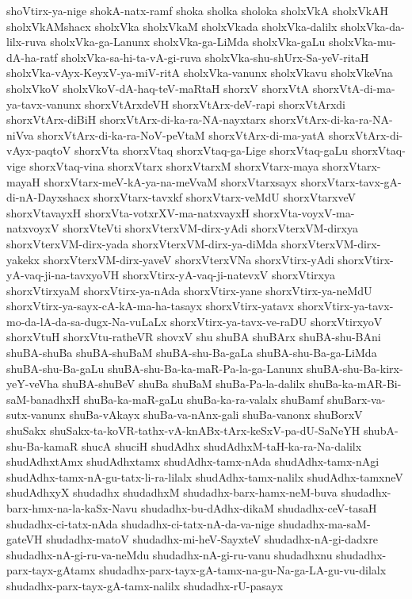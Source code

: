 {shoVtirx-ya-nige
shokA-natx-ramf
shoka
sholka
sholoka
sholxVkA
sholxVkAH
sholxVkAMshacx
sholxVka
sholxVkaM
sholxVkada
sholxVka-dalilx
sholxVka-da-lilx-ruva
sholxVka-ga-Lanunx
sholxVka-ga-LiMda
sholxVka-gaLu
sholxVka-mu-dA-ha-ratf
sholxVka-sa-hi-ta-vA-gi-ruva
sholxVka-shu-shUrx-Sa-yeV-ritaH
sholxVka-vAyx-KeyxV-ya-miV-ritA
sholxVka-vanunx
sholxVkavu
sholxVkeVna
sholxVkoV
sholxVkoV-dA-haq-teV-maRtaH
shorxV
shorxVtA
shorxVtA-di-ma-ya-tavx-vanunx
shorxVtArxdeVH
shorxVtArx-deV-rapi
shorxVtArxdi
shorxVtArx-diBiH
shorxVtArx-di-ka-ra-NA-nayxtarx
shorxVtArx-di-ka-ra-NA-niVva
shorxVtArx-di-ka-ra-NoV-peVtaM
shorxVtArx-di-ma-yatA
shorxVtArx-di-vAyx-paqtoV
shorxVta
shorxVtaq
shorxVtaq-ga-Lige
shorxVtaq-gaLu
shorxVtaq-vige
shorxVtaq-vina
shorxVtarx
shorxVtarxM
shorxVtarx-maya
shorxVtarx-mayaH
shorxVtarx-meV-kA-ya-na-meVvaM
shorxVtarxsayx
shorxVtarx-tavx-gA-di-nA-Dayxshacx
shorxVtarx-tavxkf
shorxVtarx-veMdU
shorxVtarxveV
shorxVtavayxH
shorxVta-votxrXV-ma-natxvayxH
shorxVta-voyxV-ma-natxvoyxV
shorxVteVti
shorxVterxVM-dirx-yAdi
shorxVterxVM-dirxya
shorxVterxVM-dirx-yada
shorxVterxVM-dirx-ya-diMda
shorxVterxVM-dirx-yakekx
shorxVterxVM-dirx-yaveV
shorxVterxVNa
shorxVtirx-yAdi
shorxVtirx-yA-vaq-ji-na-tavxyoVH
shorxVtirx-yA-vaq-ji-natevxV
shorxVtirxya
shorxVtirxyaM
shorxVtirx-ya-nAda
shorxVtirx-yane
shorxVtirx-ya-neMdU
shorxVtirx-ya-sayx-cA-kA-ma-ha-tasayx
shorxVtirx-yatavx
shorxVtirx-ya-tavx-mo-da-lA-da-sa-dugx-Na-vuLaLx
shorxVtirx-ya-tavx-ve-raDU
shorxVtirxyoV
shorxVtuH
shorxVtu-ratheVR
shovxV
shu
shuBA
shuBArx
shuBA-shu-BAni
shuBA-shuBa
shuBA-shuBaM
shuBA-shu-Ba-gaLa
shuBA-shu-Ba-ga-LiMda
shuBA-shu-Ba-gaLu
shuBA-shu-Ba-ka-maR-Pa-la-ga-Lanunx
shuBA-shu-Ba-kirx-yeY-veVha
shuBA-shuBeV
shuBa
shuBaM
shuBa-Pa-la-dalilx
shuBa-ka-mAR-Bi-saM-banadhxH
shuBa-ka-maR-gaLu
shuBa-ka-ra-valalx
shuBamf
shuBarx-va-sutx-vanunx
shuBa-vAkayx
shuBa-va-nAnx-gali
shuBa-vanonx
shuBorxV
shuSakx
shuSakx-ta-koVR-tathx-vA-knABx-tArx-keSxV-pa-dU-SaNeYH
shubA-shu-Ba-kamaR
shucA
shuciH
shudAdhx
shudAdhxM-taH-ka-ra-Na-dalilx
shudAdhxtAmx
shudAdhxtamx
shudAdhx-tamx-nAda
shudAdhx-tamx-nAgi
shudAdhx-tamx-nA-gu-tatx-li-ra-lilalx
shudAdhx-tamx-nalilx
shudAdhx-tamxneV
shudAdhxyX
shudadhx
shudadhxM
shudadhx-barx-hamx-neM-buva
shudadhx-barx-hmx-na-la-kaSx-Navu
shudadhx-bu-dAdhx-dikaM
shudadhx-ceV-tasaH
shudadhx-ci-tatx-nAda
shudadhx-ci-tatx-nA-da-va-nige
shudadhx-ma-saM-gateVH
shudadhx-matoV
shudadhx-mi-heV-SayxteV
shudadhx-nA-gi-dadxre
shudadhx-nA-gi-ru-va-neMdu
shudadhx-nA-gi-ru-vanu
shudadhxnu
shudadhx-parx-tayx-gAtamx
shudadhx-parx-tayx-gA-tamx-na-gu-Na-ga-LA-gu-vu-dilalx
shudadhx-parx-tayx-gA-tamx-nalilx
shudadhx-rU-pasayx
}
